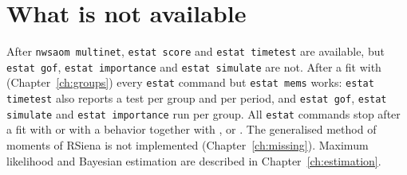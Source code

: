 \section{What is not available}

After \texttt{nwsaom multinet}, \texttt{estat score} and \texttt{estat timetest} are available, but \texttt{estat gof}, \texttt{estat importance} and \texttt{estat simulate} are not. After a fit with  (Chapter~\ref{ch:groups}) every \texttt{estat} command but \texttt{estat mems} works: \texttt{estat timetest} also reports a test per group and per period, and \texttt{estat gof}, \texttt{estat simulate} and \texttt{estat importance} run per group. All \texttt{estat} commands stop after a fit with  or with a behavior together with ,  or . The generalised method of moments of RSiena is not implemented (Chapter~\ref{ch:missing}). Maximum likelihood and Bayesian estimation are described in Chapter~\ref{ch:estimation}.

